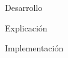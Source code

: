 \begin{section}{Desarrollo}
	\begin{subsection}{Explicación}
		
	\end{subsection}
	\begin{subsection}{Implementación}

	\end{subsection}
\end{section}
